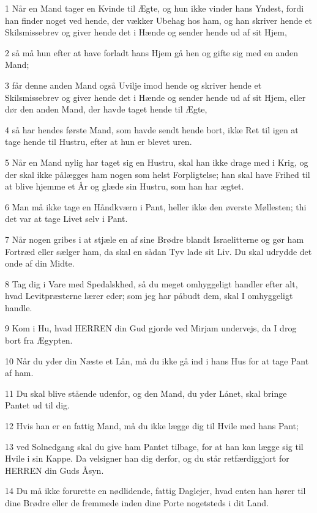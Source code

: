 \par 1 Når en Mand tager en Kvinde til Ægte, og hun ikke vinder hans Yndest, fordi han finder noget ved hende, der vækker Ubehag hos ham, og han skriver hende et Skilsmissebrev og giver hende det i Hænde og sender hende ud af sit Hjem,
\par 2 så må hun efter at have forladt hans Hjem gå hen og gifte sig med en anden Mand;
\par 3 får denne anden Mand også Uvilje imod hende og skriver hende et Skilsmissebrev og giver hende det i Hænde og sender hende ud af sit Hjem, eller dør den anden Mand, der havde taget hende til Ægte,
\par 4 så har hendes første Mand, som havde sendt hende bort, ikke Ret til igen at tage hende til Hustru, efter at hun er blevet uren.
\par 5 Når en Mand nylig har taget sig en Hustru, skal han ikke drage med i Krig, og der skal ikke pålægges ham nogen som helst Forpligtelse; han skal have Frihed til at blive hjemme et År og glæde sin Hustru, som han har ægtet.
\par 6 Man må ikke tage en Håndkværn i Pant, heller ikke den øverste Møllesten; thi det var at tage Livet selv i Pant.
\par 7 Når nogen gribes i at stjæle en af sine Brødre blandt Israelitterne og gør ham Fortræd eller sælger ham, da skal en sådan Tyv lade sit Liv. Du skal udrydde det onde af din Midte.
\par 8 Tag dig i Vare med Spedalskhed, så du meget omhyggeligt handler efter alt, hvad Levitpræsterne lærer eder; som jeg har påbudt dem, skal I omhyggeligt handle.
\par 9 Kom i Hu, hvad HERREN din Gud gjorde ved Mirjam undervejs, da I drog bort fra Ægypten.
\par 10 Når du yder din Næste et Lån, må du ikke gå ind i hans Hus for at tage Pant af ham.
\par 11 Du skal blive stående udenfor, og den Mand, du yder Lånet, skal bringe Pantet ud til dig.
\par 12 Hvis han er en fattig Mand, må du ikke lægge dig til Hvile med hans Pant;
\par 13 ved Solnedgang skal du give ham Pantet tilbage, for at han kan lægge sig til Hvile i sin Kappe. Da velsigner han dig derfor, og du står retfærdiggjort for HERREN din Guds Åsyn.
\par 14 Du må ikke forurette en nødlidende, fattig Daglejer, hvad enten han hører til dine Brødre eller de fremmede inden dine Porte nogetsteds i dit Land.
